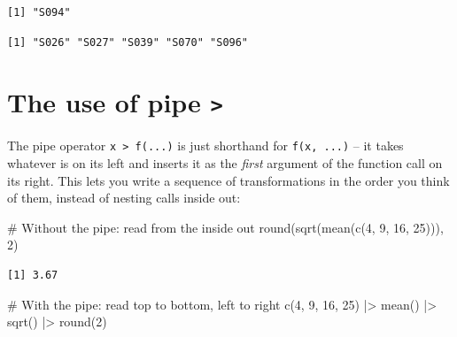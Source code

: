 \documentclass[
  letterpaper,
  DIV=11,
  numbers=noendperiod]{scrreprt}
\newenvironment{Shaded}{\begin{snugshade}}{\end{snugshade}}
\newcommand{\CommentTok}[1]{\textcolor[rgb]{0.37,0.37,0.37}{#1}}
\newcommand{\DecValTok}[1]{\textcolor[rgb]{0.68,0.00,0.00}{#1}}
\newcommand{\FunctionTok}[1]{\textcolor[rgb]{0.28,0.35,0.67}{#1}}
\newcommand{\NormalTok}[1]{\textcolor[rgb]{0.00,0.23,0.31}{#1}}
\newcommand{\SpecialCharTok}[1]{\textcolor[rgb]{0.37,0.37,0.37}{#1}}
\begin{document}
\begin{verbatim}
[1] "S094"
\end{verbatim}

\begin{Shaded}
\end{Shaded}

\begin{verbatim}
[1] "S026" "S027" "S039" "S070" "S096"
\end{verbatim}

\section{\texorpdfstring{The use of pipe
\texttt{\textbar{}\textgreater{}}}{The use of pipe \textbar\textgreater{}}}\label{the-use-of-pipe}

The pipe operator \texttt{x\ \textbar{}\textgreater{}\ f(...)} is just
shorthand for \texttt{f(x,\ ...)} -- it takes whatever is on its left
and inserts it as the \emph{first} argument of the function call on its
right. This lets you write a sequence of transformations in the order
you think of them, instead of nesting calls inside out:

\begin{Shaded}
\begin{Highlighting}[]
\CommentTok{\# Without the pipe: read from the inside out}
\FunctionTok{round}\NormalTok{(}\FunctionTok{sqrt}\NormalTok{(}\FunctionTok{mean}\NormalTok{(}\FunctionTok{c}\NormalTok{(}\DecValTok{4}\NormalTok{, }\DecValTok{9}\NormalTok{, }\DecValTok{16}\NormalTok{, }\DecValTok{25}\NormalTok{))), }\DecValTok{2}\NormalTok{)}
\end{Highlighting}
\end{Shaded}

\begin{verbatim}
[1] 3.67
\end{verbatim}

\begin{Shaded}
\begin{Highlighting}[]
\CommentTok{\# With the pipe: read top to bottom, left to right}
\FunctionTok{c}\NormalTok{(}\DecValTok{4}\NormalTok{, }\DecValTok{9}\NormalTok{, }\DecValTok{16}\NormalTok{, }\DecValTok{25}\NormalTok{) }\SpecialCharTok{|\textgreater{}}
    \FunctionTok{mean}\NormalTok{() }\SpecialCharTok{|\textgreater{}}
    \FunctionTok{sqrt}\NormalTok{() }\SpecialCharTok{|\textgreater{}}
    \FunctionTok{round}\NormalTok{(}\DecValTok{2}\NormalTok{)}
\end{Highlighting}
\end{Shaded}
\end{document}
